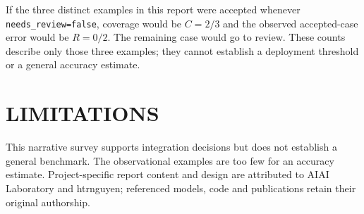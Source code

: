\documentclass[10pt,a4paper]{article}
\begin{document}
If the three distinct examples in this report were accepted whenever \texttt{needs\_review=false}, coverage would be $C=2/3$ and the observed accepted-case error would be $R=0/2$. The remaining case would go to review. These counts describe only those three examples; they cannot establish a deployment threshold or a general accuracy estimate.

\section{LIMITATIONS}
This narrative survey supports integration decisions but does not establish a general benchmark. The observational examples are too few for an accuracy estimate. Project-specific report content and design are attributed to AIAI Laboratory and htrnguyen; referenced models, code and publications retain their original authorship.
\clearpage

\end{document}
